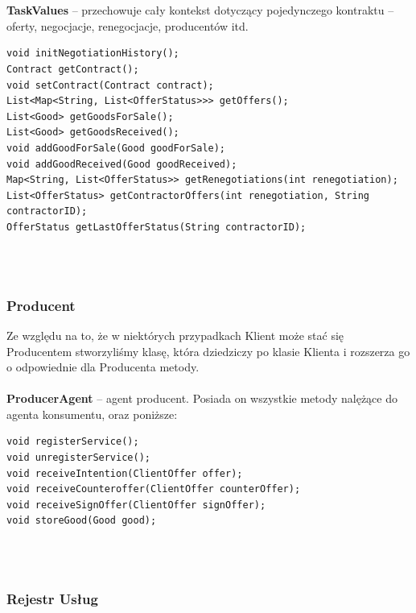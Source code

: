 \documentclass[a4paper,12pt]{article}
\begin{document}
\\ \\
\textbf{TaskValues} – przechowuje cały kontekst dotyczący pojedynczego kontraktu – oferty, negocjacje, renegocjacje, producentów itd.
\begin{lstlisting}
void initNegotiationHistory();
Contract getContract();
void setContract(Contract contract);
List<Map<String, List<OfferStatus>>> getOffers();
List<Good> getGoodsForSale();
List<Good> getGoodsReceived();
void addGoodForSale(Good goodForSale);
void addGoodReceived(Good goodReceived);
Map<String, List<OfferStatus>> getRenegotiations(int renegotiation);
List<OfferStatus> getContractorOffers(int renegotiation, String contractorID);
OfferStatus getLastOfferStatus(String contractorID);
\end{lstlisting}
\\ \\

\subsubsection{Producent}

Ze względu na to, że w niektórych przypadkach Klient może stać się Producentem stworzyliśmy klasę, która dziedziczy po klasie Klienta i rozszerza go o odpowiednie dla Producenta metody.
\\ \\
\textbf{ProducerAgent} – agent producent. Posiada on wszystkie metody nalężące do agenta konsumentu, oraz poniższe:
\begin{lstlisting}
void registerService();
void unregisterService();
void receiveIntention(ClientOffer offer);
void receiveCounteroffer(ClientOffer counterOffer);
void receiveSignOffer(ClientOffer signOffer);
void storeGood(Good good);
\end{lstlisting}
\\ \\

\subsubsection{Rejestr Usług}
\end{document}
